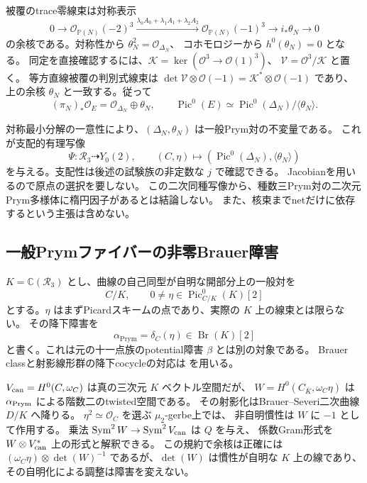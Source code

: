 被覆のtrace零線束は対称表示
\[
 0\longrightarrow\mathcal O_{\mathbb P(N)}(-2)^3
 \xrightarrow{\lambda_0A_0+\lambda_1A_1+\lambda_2A_2}
 \mathcal O_{\mathbb P(N)}(-1)^3\longrightarrow i_*\theta_N\longrightarrow0
\]
の余核である。対称性から $\theta_N^2=\mathcal O_{\Delta_N}$、
コホモロジーから $h^0(\theta_N)=0$ となる。
同定を直接確認するには、$\mathscr K=\ker(\mathcal O^3\to\mathcal O(1)^3)$、
$\mathscr V=\mathcal O^3/\mathscr K$ と置く。
等方直線被覆の判別式線束は
$\det\mathscr V\otimes\mathcal O(-1)=\mathscr K^*\otimes\mathcal O(-1)$ であり、
上の余核 $\theta_N$ と一致する。従って
\[
 (\pi_N)_*\mathcal O_E=\mathcal O_{\Delta_N}\oplus\theta_N,
 \qquad
 \operatorname{Pic}^0(E)
 \simeq\operatorname{Pic}^0(\Delta_N)/\langle\theta_N\rangle.
\]

対称最小分解の一意性により、$(\Delta_N,\theta_N)$ は一般Prym対の不変量である。
これが支配的有理写像
\[
 \Psi:\mathcal R_3\dashrightarrow Y_0(2),\qquad
 (C,\eta)\longmapsto
 (\operatorname{Pic}^0(\Delta_N),\langle\theta_N\rangle)
\]
を与える。支配性は後述の試験族の非定数な $j$ で確認できる。
Jacobianを用いるので原点の選択を要しない。
この二次同種写像から、種数三Prym対の二次元Prym多様体に楕円因子があるとは結論しない。
また、核束までnetだけに依存するという主張は含めない。



\subsection{一般Prymファイバーの非零Brauer障害}
\label{subsec:notes-brauer-v27}

$K=\mathbb C(\mathcal R_3)$ とし、曲線の自己同型が自明な開部分上の一般対を
\[
 C/K,\qquad 0\ne\eta\in\operatorname{Pic}^0_{C/K}(K)[2]
\]
とする。$\eta$ はまずPicardスキームの点であり、実際の $K$ 上の線束とは限らない。
その降下障害を
\[
 \alpha_{\mathrm{Prym}}=\delta_C(\eta)\in\operatorname{Br}(K)[2]
\]
と書く。これは元の十一点族のpotential障害 $\beta$ とは別の対象である。
Brauer classと射影線形群の降下cocycleの対応は
\cite[Tags 03R1, 0A2J]{StacksBrauerV27}を用いる。

$V_{\rm can}=H^0(C,\omega_C)$ は真の三次元 $K$ ベクトル空間だが、
$W=H^0(C_{\overline K},\omega_C\eta)$ は $\alpha_{\rm Prym}$ による階数二のtwisted空間である。
その射影化はBrauer--Severi二次曲線 $D/K$ へ降りる。
$\eta^2\simeq\mathcal O_C$ を選ぶ $\mu_2$-gerbe上では、
非自明慣性は $W$ に $-1$ として作用する。
乗法 $\operatorname{Sym}^2W\to\operatorname{Sym}^2V_{\rm can}$ は $Q$ を与え、
係数Gram形式を $W\otimes V_{\rm can}^*$ 上の形式と解釈できる。
この規約で余核は正確には
$(\omega_C\eta)\otimes\det(W)^{-1}$ であるが、$\det(W)$ は慣性が自明な $K$ 上の線であり、
その自明化による調整は障害を変えない。

